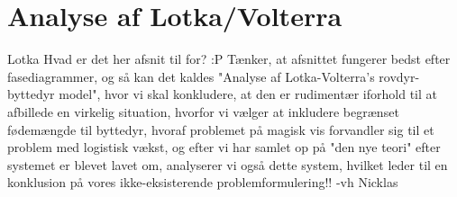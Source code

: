 \section{Analyse af Lotka/Volterra}
Lotka Hvad er det her afsnit til for? :P Tænker, at afsnittet fungerer bedst efter fasediagrammer, og så kan det kaldes "Analyse af Lotka-Volterra's rovdyr-byttedyr model", hvor vi skal konkludere, at den er rudimentær iforhold til at afbillede en virkelig situation, hvorfor vi vælger at inkludere begrænset fødemængde til byttedyr, hvoraf problemet på magisk vis forvandler sig til et problem med logistisk vækst, og efter vi har samlet op på "den nye teori" efter systemet er blevet lavet om, analyserer vi også dette system, hvilket leder til en konklusion på vores ikke-eksisterende problemformulering!!
\hfill \break
-vh Nicklas